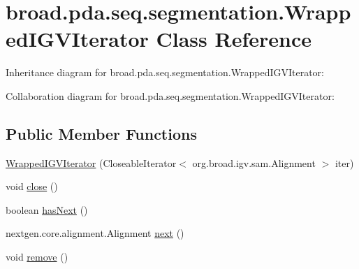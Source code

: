 \hypertarget{classbroad_1_1pda_1_1seq_1_1segmentation_1_1_wrapped_i_g_v_iterator}{\section{broad.\+pda.\+seq.\+segmentation.\+Wrapped\+I\+G\+V\+Iterator Class Reference}
\label{classbroad_1_1pda_1_1seq_1_1segmentation_1_1_wrapped_i_g_v_iterator}
}


Inheritance diagram for broad.\+pda.\+seq.\+segmentation.\+Wrapped\+I\+G\+V\+Iterator\+:


Collaboration diagram for broad.\+pda.\+seq.\+segmentation.\+Wrapped\+I\+G\+V\+Iterator\+:
\subsection*{Public Member Functions}
\begin{DoxyCompactItemize}
\item 
\hyperlink{classbroad_1_1pda_1_1seq_1_1segmentation_1_1_wrapped_i_g_v_iterator_a489338d9ba527827ce6220a5d169cec2}{Wrapped\+I\+G\+V\+Iterator} (Closeable\+Iterator$<$ org.\+broad.\+igv.\+sam.\+Alignment $>$ iter)
\item 
void \hyperlink{classbroad_1_1pda_1_1seq_1_1segmentation_1_1_wrapped_i_g_v_iterator_ac4ea627972346e3bfbccb77dd81793b3}{close} ()
\item 
boolean \hyperlink{classbroad_1_1pda_1_1seq_1_1segmentation_1_1_wrapped_i_g_v_iterator_a7cdb091f4779c68415ebe050eafa1505}{has\+Next} ()
\item 
nextgen.\+core.\+alignment.\+Alignment \hyperlink{classbroad_1_1pda_1_1seq_1_1segmentation_1_1_wrapped_i_g_v_iterator_acb888d804d00c750403f0d7dfec995bf}{next} ()
\item 
void \hyperlink{classbroad_1_1pda_1_1seq_1_1segmentation_1_1_wrapped_i_g_v_iterator_a58f7b88eebe7b9a062efe63409571cc2}{remove} ()
\end{DoxyCompactItemize}



